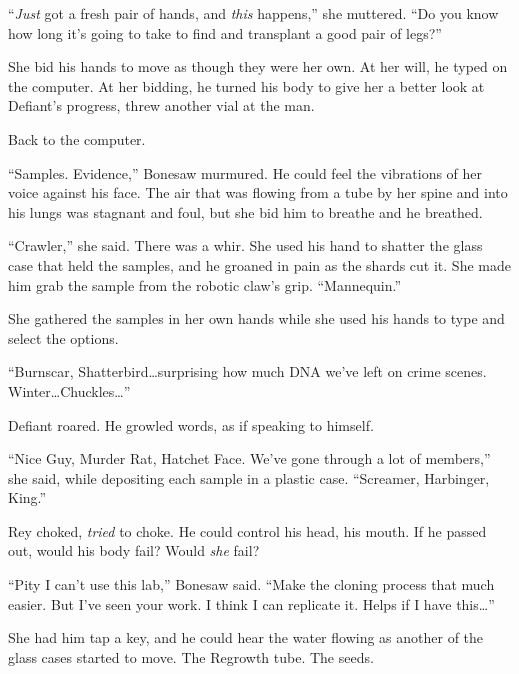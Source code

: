 ``\emph{Just} got a fresh pair of hands, and \emph{this} happens,'' she muttered.  ``Do you know how long it's going to take to find and transplant a good pair of legs?''



She bid his hands to move as though they were her own.  At her will, he typed on the computer.  At her bidding, he turned his body to give her a better look at Defiant's progress, threw another vial at the man.



Back to the computer.



``Samples.  Evidence,'' Bonesaw murmured.  He could feel the vibrations of her voice against his face.  The air that was flowing from a tube by her spine and into his lungs was stagnant and foul, but she bid him to breathe and he breathed.



``Crawler,'' she said.  There was a whir.  She used his hand to shatter the glass case that held the samples, and he groaned in pain as the shards cut it.  She made him grab the sample from the robotic claw's grip.  ``Mannequin.''



She gathered the samples in her own hands while she used his hands to type and select the options.



``Burnscar, Shatterbird\ldots surprising how much DNA we've left on crime scenes.  Winter\ldots Chuckles\ldots''



Defiant roared.  He growled words, as if speaking to himself.



``Nice Guy, Murder Rat, Hatchet Face.  We've gone through a lot of members,'' she said, while depositing each sample in a plastic case.  ``Screamer, Harbinger, King.''



Rey choked, \emph{tried} to choke.  He could control his head, his mouth.  If he passed out, would his body fail?  Would \emph{she} fail?



``Pity I can't use this lab,'' Bonesaw said.  ``Make the cloning process that much easier.  But I've seen your work.  I think I can replicate it.  Helps if I have this\ldots''



She had him tap a key, and he could hear the water flowing as another of the glass cases started to move.  The Regrowth tube.  The seeds.



